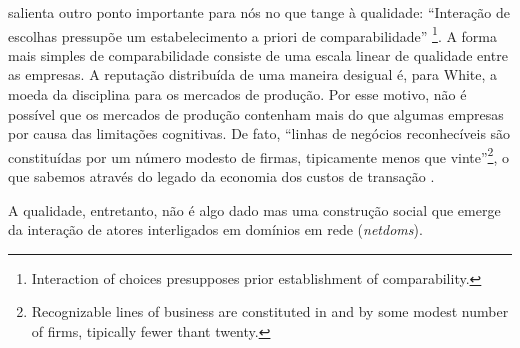 \documentclass[a4paper, 12pt, openright, oneside, german, french, english, brazil]{abntex2}
\begin{document}
	 salienta outro ponto importante para nós no que tange à qualidade: ``Interação de escolhas pressupõe um estabelecimento a priori de comparabilidade''
	\footnote{Interaction of choices presupposes prior establishment of comparability.}. A forma mais simples de comparabilidade consiste de uma escala linear de qualidade entre as empresas. A reputação distribuída de uma maneira desigual é, para White, a moeda da disciplina para os mercados de produção. Por esse motivo, não é possível que os mercados de produção contenham mais do que algumas empresas por causa das limitações cognitivas. De fato, ``linhas de negócios reconhecíveis são constituídas por um número modesto de firmas, tipicamente menos que vinte''\footnote{Recognizable lines of business are constituted in and by some modest number of firms, tipically fewer thant twenty.}, o que sabemos através do legado da economia dos custos de transação .
	
	A qualidade, entretanto, não é algo dado mas uma construção social que emerge da interação de atores interligados em domínios em rede (\textit{netdoms}). 
	
	
	
	
	
\end{document}
